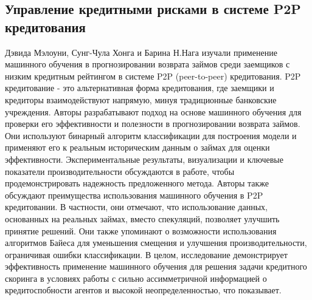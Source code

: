 \documentclass[14pt, letterpaper, twoside]{extarticle}
\begin{document}
\subsection{Управление кредитными рисками в системе P2P кредитования}

Дэвида Мэлоуни, Сунг-Чула Хонга и Барина Н.Нага \cite{maloney2022two} изучали применение машинного обучения в прогнозировании возврата займов среди заемщиков с низким кредитным рейтингом в системе P2P (peer-to-peer) кредитования. P2P кредитование - это альтернативная форма кредитования, где заемщики и кредиторы взаимодействуют напрямую, минуя традиционные банковские учреждения. Авторы разрабатывают подход на основе машинного обучения для проверки его эффективности и полезности в прогнозировании возврата займов. Они используют бинарный алгоритм классификации для построения модели и применяют его к реальным историческим данным о займах для оценки эффективности. Экспериментальные результаты, визуализации и ключевые показатели производительности обсуждаются в работе, чтобы продемонстрировать надежность предложенного метода. Авторы также обсуждают преимущества использования машинного обучения в P2P кредитовании. В частности, они отмечают, что использование данных, основанных на реальных займах, вместо спекуляций, позволяет улучшить принятие решений. Они также упоминают о возможности использования алгоритмов Байеса для уменьшения смещения и улучшения производительности, ограничивая ошибки классификации. В целом, исследование демонстрирует эффективность применение машинного обучения для решения задачи кредитного скоринга в условиях работы с сильно ассимметричной информацией о кредитоспобности агентов и высокой неопределенностью, что показывает.
\end{document}
